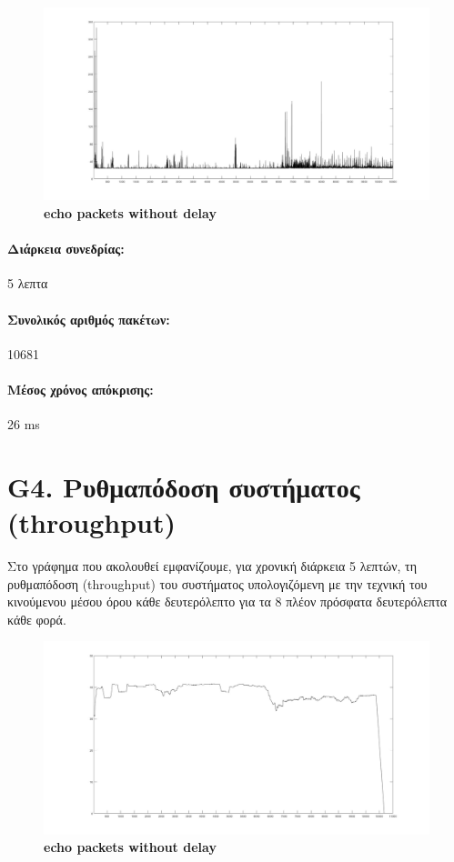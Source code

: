 \documentclass{article}
\begin{document}
\begin{figure}[h!]
 \begin{center}
 \advance\leftskip-4cm
  \includegraphics[width=200mm,scale=0.7]{g3s1.jpg}
  \caption*{\textbf{echo packets without delay}}
  
\end{center}
\end{figure}
\paragraph{Διάρκεια συνεδρίας:} 5 λεπτα
\paragraph{Συνολικός αριθμός πακέτων: }10681
\paragraph{Μέσος χρόνος απόκρισης: }26 ms
\newpage
\large{}
\section*{G4. Ρυθμαπόδοση συστήματος (throughput)}
Στο γράφημα που ακολουθεί εμφανίζουμε, για χρονική διάρκεια 5 λεπτών, τη ρυθμαπόδοση (throughput) του συστήματος υπολογιζόμενη με
την τεχνική του κινούμενου μέσου όρου κάθε δευτερόλεπτο για τα 8 πλέον πρόσφατα δευτερόλεπτα κάθε φορά.

\begin{figure}[h!]
 \begin{center}
 \advance\leftskip-6cm
  \includegraphics[width=240mm,scale=0.7]{g4s1.jpg}
   \caption*{\textbf{echo packets without delay}}
  
\end{center}
\end{figure}
\end{document}
